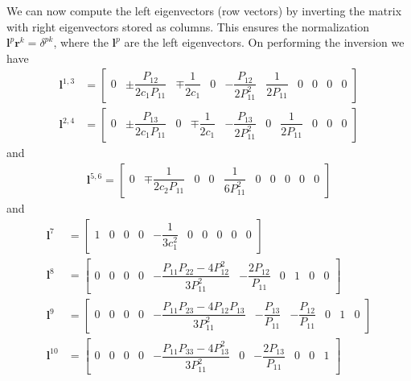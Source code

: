 \documentclass[11pt, reqno]{amsart}
\newcommand{\mvec}[1]{\mathbf{#1}}
\theoremstyle{definition}
\begin{document}
We can now compute the left eigenvectors (row vectors) by inverting
the matrix with right eigenvectors stored as columns. This ensures the
normalization $\mvec{l}^p \mvec{r}^k = \delta^{pk}$, where the
$\mvec{l}^p$ are the left eigenvectors. On performing the inversion we
have
\begin{align}
  \mvec{l}^{1,3} &= 
  \left[
    \begin{matrix}
      0 & \pm\dfrac{P_{12}}{2c_1P_{11}} & \mp\dfrac{1}{2c_1} & 
      0 & -\dfrac{P_{12}}{2P_{11}^2} & \dfrac{1}{2P_{11}} & 0 & 0 & 0 & 0
    \end{matrix}
  \right] \\
  \mvec{l}^{2,4} &= 
  \left[
    \begin{matrix}
      0 & \pm\dfrac{P_{13}}{2c_1P_{11}} & 0 & \mp\dfrac{1}{2c_1}
      & -\dfrac{P_{13}}{2P_{11}^2} & 0 & \dfrac{1}{2P_{11}} & 0 & 0 & 0
    \end{matrix}
  \right]
\end{align}
and
\begin{align}
  \mvec{l}^{5,6} = 
  \left[
    \begin{matrix}
      0 & \mp\dfrac{1}{2c_2P_{11}} & 0 & 0 & \dfrac{1}{6P_{11}^2}
      & 0 & 0 & 0 & 0 & 0
    \end{matrix}
    \right]
\end{align}
and
\begin{align}
  \mvec{l}^{7} &= 
  \left[
    \begin{matrix}
      1 & 0 & 0 & 0 & -\dfrac{1}{3c_1^2} & 0 & 0 & 0 & 0 & 0
    \end{matrix}
    \right] \\
  \mvec{l}^{8} &= 
  \left[
    \begin{matrix}
      0 & 0 & 0 & 0 & -\dfrac{P_{11}P_{22}-4P_{12}^2}{3P_{11}^2} 
      & -\dfrac{2P_{12}}{P_{11}} & 0 & 1 & 0 & 0
    \end{matrix}
    \right] \\
  \mvec{l}^{9} &= 
  \left[
    \begin{matrix}
      0 & 0 & 0 & 0 & -\dfrac{P_{11}P_{23}-4P_{12}P_{13}}{3P_{11}^2} 
      & -\dfrac{P_{13}}{P_{11}} & -\dfrac{P_{12}}{P_{11}} & 0 & 1 & 0
    \end{matrix}
    \right] \\
  \mvec{l}^{10} &= 
  \left[
    \begin{matrix}
      0 & 0 & 0 & 0 & -\dfrac{P_{11}P_{33}-4P_{13}^2}{3P_{11}^2} & 0
      & -\dfrac{2P_{13}}{P_{11}} & 0 & 0 & 1
    \end{matrix}
    \right]
\end{align}



\end{document}
